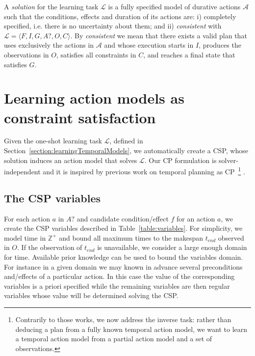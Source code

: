 \documentclass{ecai}
\newcommand{\tup}[1]{{\langle #1 \rangle}}
\begin{document}
A {\em solution} for the learning task $\mathcal{L}$ is a fully specified model of durative actions $\mathcal{A}$ such that the conditions, effects and duration of its actions are: i) completely specified, i.e. there is no uncertainty about them; and ii) {\em consistent} with $\mathcal{L}=\tup{F,I,G,A?,O,C}$. By {\em consistent} we mean that there exists a valid plan that uses exclusively the actions in $\mathcal{A}$ and whose execution starts in $I$, produces the observations in $O$, satisfies all constraints in $C$, and reaches a final state that satisfies $G$.



\section{Learning action models as constraint satisfaction}
\label{section:learningAsCSP}
Given the one-shot learning task $\mathcal{L}$, defined in Section~\ref{section:learningTemporalModels}, we automatically create a CSP, whose solution induces an action model that solves $\mathcal{L}$. Our CP formulation is solver-independent 
and it is inspired by previous work on temporal planning as CP~\cite{garrido2009constraint,vidal2006branching}\footnote{Contrarily to those works, we now address the inverse task: rather than deducing a plan from a fully known temporal action model, we want to learn a temporal action model from a partial action model and a set of observations.} .


\subsection{The CSP variables}
For each action $a$ in $A?$ and candidate condition/effect $f$ for an action $a$, we create the CSP variables described in Table~\ref{table:variables}. For simplicity, we model time in $\mathbb{Z}^+$ and bound all maximum times to the makespan $t_{end}$ observed in $O$. If the observation of $t_{end}$ is unavailable, we consider a large enough domain for time. Available prior knowledge can be used to bound the variables domain. For instance in a given domain we may known in advance several preconditions and/effects of a particular action. In this case the value of the corresponding variables is a priori specified while the remaining variables are then regular variables whose value will be determined solving the CSP.
\end{document}
